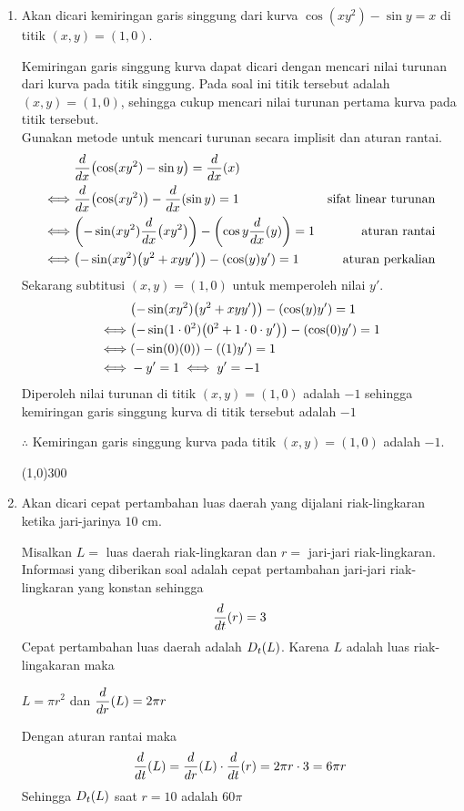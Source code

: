\begin{enumerate}[leftmargin=*, label={\arabic*}.]
\item Akan dicari kemiringan garis singgung dari kurva 
$\cos (xy^{2})-\sin y = x$ di titik $(x,y) = (1,0)$.

Kemiringan garis singgung kurva dapat dicari dengan mencari nilai turunan dari kurva 
pada titik singgung. Pada soal ini titik tersebut adalah $(x,y) = (1,0)$, sehingga 
cukup mencari nilai turunan pertama kurva pada titik tersebut.\\
Gunakan metode untuk mencari turunan secara implisit dan aturan rantai.
\begin{align*}
    &\drv{x}{\cos (xy^{2})-\sin y} = \drv{x}{x}\\
    \iff &\drv{x}{\cos (xy^{2})} - \drv{x}{\sin y} = 1
    &\text{sifat linear turunan}\\
    \iff &\brk*{-\sin(xy^{2})\drv{x}{xy^{2}}}
    -\brk*{\cos y \drv{x}{y}} = 1
    &\text{aturan rantai}\\
    \iff &\brk*{-\sin (xy^{2})\brk*{y^{2}+xyy'}} 
    -\brk*{\cos (y) y'} = 1
    &\text{aturan perkalian}
\end{align*}
Sekarang subtitusi $(x,y)=(1,0)$ untuk memperoleh nilai $y'$.
\begin{align*}
    &\brk*{-\sin (xy^{2})\brk*{y^{2}+xyy'}} - \brk*{\cos (y) y'} = 1\\
    \iff &\brk*{-\sin (1\cdot 0^{2})\brk*{0^{2}+1\cdot 0\cdot y'}} - \brk*{\cos (0) y'} = 1\\
    \iff &\brk*{-\sin(0)(0)} - \brk*{(1)y'} = 1\\
    \iff &-y' = 1 \iff y'=-1
\end{align*}
Diperoleh nilai turunan di titik $(x,y) = (1,0)$ adalah $-1$ sehingga kemiringan 
garis singgung kurva di titik tersebut adalah $-1$

$\therefore$ Kemiringan garis singgung kurva pada titik $(x,y) = (1,0)$ adalah $-1$.


\begin{center}\line(1,0){300}\end{center}


\item Akan dicari cepat pertambahan luas daerah yang dijalani riak-lingkaran ketika 
jari-jarinya $10$ cm.

Misalkan $L=$ luas daerah riak-lingkaran dan $r=$ jari-jari riak-lingkaran.\\
Informasi yang diberikan soal adalah cepat pertambahan jari-jari riak-lingkaran yang 
konstan sehingga 
\[\drv{t}{r} = 3\]
Cepat pertambahan luas daerah adalah $\drvL{t}{L}$. Karena $L$ adalah luas 
riak-lingakaran maka 
\begin{center}
    $L = \pi r^{2}$ dan $\ds \drv{r}{L} = 2\pi r$
\end{center}
Dengan aturan rantai maka
\[
\drv{t}{L} = \drv{r}{L}\cdot\drv{t}{r} = 2\pi r \cdot 3 = 6\pi r
\]
Sehingga $\drvL{t}{L}$ saat $r=10$ adalah $60\pi$


\end{enumerate}
